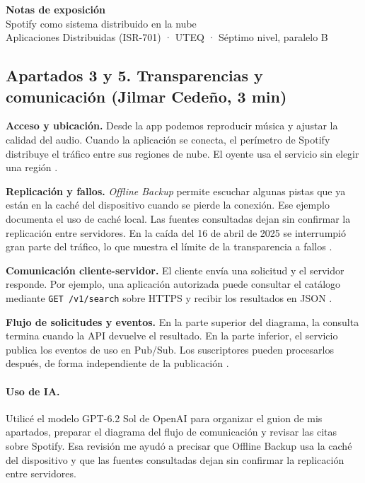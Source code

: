 \documentclass[10pt,a4paper]{article}
\begin{document}
\begin{center}
  {\Large\bfseries Notas de exposición}\\[0.3em]
  {\large Spotify como sistema distribuido en la nube}\\[0.3em]
  Aplicaciones Distribuidas (ISR-701) · UTEQ · Séptimo nivel, paralelo B
\end{center}



\subsection*{Apartados 3 y 5. Transparencias y comunicación (Jilmar Cedeño, 3 min)}
\textbf{Acceso y ubicación.} Desde la app podemos reproducir música y
ajustar la calidad del audio. Cuando la aplicación se conecta, el perímetro
de Spotify distribuye el tráfico entre sus regiones de nube. El oyente usa
el servicio sin elegir una región \cite{spotifyLossless2025,spotifyIncident2025}.

\textbf{Replicación y fallos.} \emph{Offline Backup} permite escuchar algunas
pistas que ya están en la caché del dispositivo cuando se pierde la conexión.
Ese ejemplo documenta el uso de caché local. Las fuentes consultadas dejan
sin confirmar la replicación entre servidores. En la caída del 16 de abril
de 2025 se interrumpió gran parte del tráfico, lo que muestra el límite de
la transparencia a fallos \cite{spotifyOffline2024,spotifyIncident2025}.

\textbf{Comunicación cliente-servidor.} El cliente envía una solicitud y el
servidor responde. Por ejemplo, una aplicación autorizada puede consultar
el catálogo mediante \texttt{GET /v1/search} sobre HTTPS y recibir los
resultados en JSON \cite{spotifyWebApiSearch}.

\textbf{Flujo de solicitudes y eventos.} En la parte superior del diagrama,
la consulta termina cuando la API devuelve el resultado. En la parte
inferior, el servicio publica los eventos de uso en Pub/Sub. Los suscriptores
pueden procesarlos después, de forma independiente de la publicación
\cite{spotifyWebApiSearch,khlebnikova2024dataplatform}.

\paragraph{Uso de IA.}
Utilicé el modelo GPT-6.2 Sol de OpenAI para organizar el guion de mis
apartados, preparar el diagrama del flujo de comunicación y revisar las
citas sobre Spotify. Esa revisión me ayudó a precisar que Offline Backup
usa la caché del dispositivo y que las fuentes consultadas dejan sin
confirmar la replicación entre servidores.
\end{document}

